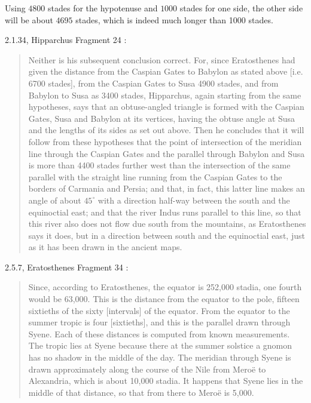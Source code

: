 \documentclass{article}
\theoremstyle{definition}
\begin{document}
Using $4800$ stades for the hypotenuse and $1000$ stades for one side,
the other side will be about $4695$ stades, which is indeed much longer than 1000 stades.

2.1.34, Hipparchus Fragment 24 \cite[p.~77]{dicks}:

\begin{quote}
Neither is his subsequent conclusion correct. For, since Eratosthenes
had given the distance from the Caspian Gates to
Babylon as stated above [i.e. 6700 stades], from the Caspian
Gates to Susa 4900 stades, and from Babylon to Susa as
3400 stades, Hipparchus, again starting from the same
hypotheses, says that an obtuse-angled triangle is formed with the 
Caspian Gates, Susa and Babylon at its vertices, having the
obtuse angle at Susa and the lengths of its sides as set out above.
Then he concludes that it will follow from these hypotheses
that the point of intersection of the meridian line through the
Caspian Gates and the parallel through Babylon and Susa is
more than 4400 stades further west than the intersection of
the same parallel with the straight line running from the
Caspian Gates to the borders of Carmania and Persia; and
that, in fact, this latter line makes an angle of about $45^\circ$ with
a direction half-way between the south and the equinoctial
east; and that the river Indus runs parallel to this line, so that
this river also does not flow due south from the mountains, as
Eratosthenes says it does, but in a direction between south and
the equinoctial east, just as it has been drawn in the ancient
maps.
\end{quote}

2.5.7, Eratosthenes Fragment 34 \cite[p.~63]{eratosthenes}:

\begin{quote}
Since, according to Eratosthenes, the equator is 252,000
stadia, one fourth would be 63,000. This is the distance from the equator
to the pole, fifteen sixtieths of the sixty [intervals] of the equator.
From the equator to the summer tropic is four [sixtieths], and this is the
parallel drawn through Syene. Each of these distances is computed from
known measurements. The tropic lies at Syene because there at the
summer solstice a gnomon has no shadow in the middle of the day. The
meridian through Syene is drawn approximately along the course of
the Nile from Mero\"e to Alexandria, which is about 10,000 stadia. It happens
that Syene lies in the middle of that distance, so that from there to
Mero\"e is 5,000.
\end{quote}
\end{document}

